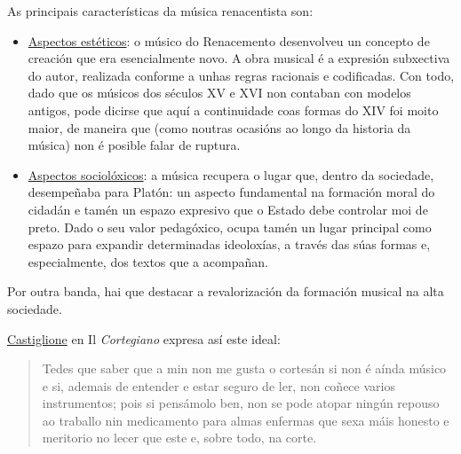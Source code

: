 \documentclass[
]{article}
\begin{document}
As principais características da música renacentista son:

\begin{itemize}
\item
  \uline{Aspectos estéticos}: o músico do Renacemento desenvolveu un
  concepto de creación que era esencialmente novo. A obra musical é a
  expresión subxectiva do autor, realizada conforme a unhas regras
  racionais e codificadas. Con todo, dado que os músicos dos séculos XV
  e XVI non contaban con modelos antigos, pode dicirse que aquí a
  continuidade coas formas do XIV foi moito maior, de maneira que (como
  noutras ocasións ao longo da historia da música) non é posible falar
  de ruptura.
\end{itemize}

\begin{itemize}
\item
  \uline{Aspectos sociolóxicos}: a música recupera o lugar que, dentro
  da sociedade, desempeñaba para Platón: un aspecto fundamental na
  formación moral do cidadán e tamén un espazo expresivo que o Estado
  debe controlar moi de preto. Dado o seu valor pedagóxico, ocupa tamén
  un lugar principal como espazo para expandir determinadas ideoloxías,
  a través das súas formas e, especialmente, dos textos que a acompañan.
\end{itemize}

Por outra banda, hai que destacar a revalorización da formación musical
na alta sociedade.

\href{http://es.wikipedia.org/wiki/Castiglione}{Castiglione} en Il
\emph{Cortegiano} expresa así este ideal:

\begin{quote}
Tedes que saber que a min non me gusta o cortesán si non é aínda músico
e si, ademais de entender e estar seguro de ler, non coñece varios
instrumentos; pois si pensámolo ben, non se pode atopar ningún repouso
ao traballo nin medicamento para almas enfermas que sexa máis honesto e
meritorio no lecer que este e, sobre todo, na corte.
\end{quote}
\end{document}
